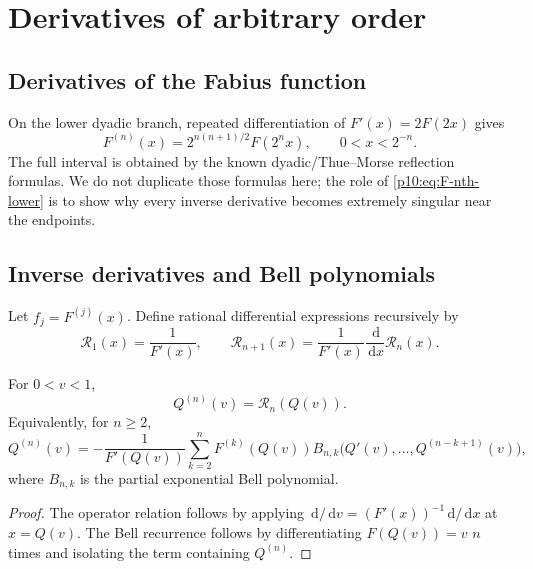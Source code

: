 \documentclass[11pt,oneside]{article}
\theoremstyle{definition}
\theoremstyle{remark}
\newcommand{\F}{F}
\newcommand{\Q}{Q}
\newcommand{\dd}{\,\mathrm d}
\newcommand{\1}{\mathbf 1}
\begin{document}
\section{Derivatives of arbitrary order}

\subsection{Derivatives of the Fabius function}

On the lower dyadic branch, repeated differentiation of
\(\F'(x)=2\F(2x)\) gives
\begin{equation}\label{p10:eq:F-nth-lower}
 \F^{(n)}(x)=2^{n(n+1)/2}\F(2^nx),
 \qquad 0<x<2^{-n}.
\end{equation}
The full interval is obtained by the known dyadic/Thue--Morse reflection formulas.
We do not duplicate those formulas here; the role of \cref{p10:eq:F-nth-lower} is to show
why every inverse derivative becomes extremely singular near the endpoints.

\subsection{Inverse derivatives and Bell polynomials}

Let \(f_j=\F^{(j)}(x)\).  Define rational differential expressions recursively by
\begin{equation}\label{p10:eq:Rinverse-rec}
 \mathcal R_1(x)=\frac1{\F'(x)},
 \qquad
 \mathcal R_{n+1}(x)=\frac1{\F'(x)}\frac{\dd}{\dd x}\mathcal R_n(x).
\end{equation}

\begin{proposition}\label{p10:prop:inverse-derivatives}
For \(0<v<1\),
\begin{equation}\label{p10:eq:Q-nth-operator}
 \Q^{(n)}(v)=\mathcal R_n(\Q(v)).
\end{equation}
Equivalently, for \(n\ge2\),
\begin{equation}\label{p10:eq:Q-Bell-rec}
 \Q^{(n)}(v)
 =-\frac1{\F'(\Q(v))}
 \sum_{k=2}^n\F^{(k)}(\Q(v))
 B_{n,k}\bigl(\Q'(v),\ldots,\Q^{(n-k+1)}(v)\bigr),
\end{equation}
where \(B_{n,k}\) is the partial exponential Bell polynomial.
\end{proposition}

\begin{proof}
The operator relation follows by applying \(\dd/\dd v=(\F'(x))^{-1}\dd/\dd x\) at
\(x=\Q(v)\).  The Bell recurrence follows by differentiating
\(\F(\Q(v))=v\) \(n\) times and isolating the term containing \(\Q^{(n)}\).
\end{proof}
\end{document}
